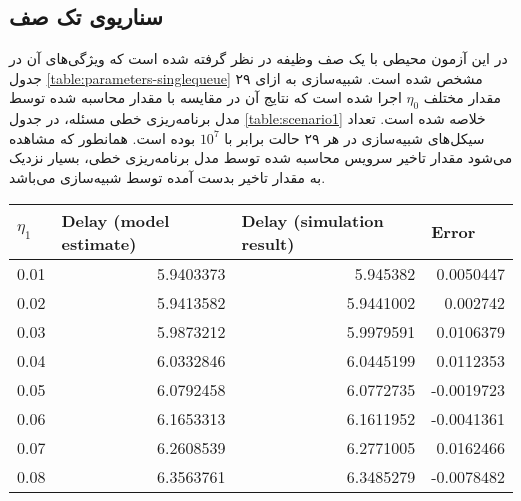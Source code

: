 \subsection{سناریوی تک صف}
در این آزمون محیطی با یک صف وظیفه در نظر گرفته شده است که ویژگی‌های آن در جدول \ref{table:parameters-singlequeue} مشخص شده است. شبیه‌سازی به ازای ۲۹ مقدار مختلف $\eta_0$ اجرا شده است که نتایج آن در مقایسه با مقدار محاسبه شده توسط مدل برنامه‌ریزی خطی مسئله، در جدول \ref{table:scenario1} خلاصه شده است. تعداد سیکل‌های شبیه‌سازی در هر ۲۹ حالت برابر با $10^7$ بوده است. همانطور که مشاهده می‌شود مقدار تاخیر سرویس محاسبه شده توسط مدل برنامه‌ریزی خطی، بسیار نزدیک به مقدار تاخیر بدست آمده توسط شبیه‌سازی می‌باشد.
\begin{table}
	\centering
	\begin{latin}
		
		\begin{tabular}{rrrr}
			\hline
			\multicolumn{1}{l}{$\eta_1$} & \multicolumn{1}{l}{Delay (model estimate)} & \multicolumn{1}{l}{Delay (simulation result)} & \multicolumn{1}{l}{Error} \\ \hline
			0.01                     & 5.9403373                                  & 5.945382                                      & 0.0050447                 \\
			0.02                     & 5.9413582                                  & 5.9441002                                     & 0.002742                  \\
			0.03                     & 5.9873212                                  & 5.9979591                                     & 0.0106379                 \\
			0.04                     & 6.0332846                                  & 6.0445199                                     & 0.0112353                 \\
			0.05                     & 6.0792458                                  & 6.0772735                                     & -0.0019723                \\
			0.06                     & 6.1653313                                  & 6.1611952                                     & -0.0041361                \\
			0.07                     & 6.2608539                                  & 6.2771005                                     & 0.0162466                 \\
			0.08                     & 6.3563761                                  & 6.3485279                                     & -0.0078482                \\

\end{tabular}
\end{latin}
\end{table}
